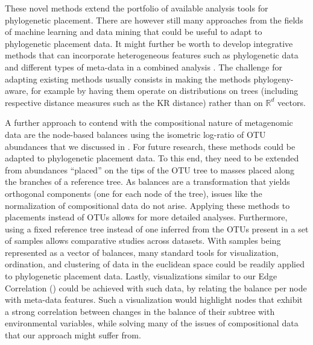 These novel methods extend the portfolio of available analysis tools for phylogenetic placement.
There are however still many approaches from the fields of machine learning and data mining
that could be useful to adapt to phylogenetic placement data.
It might further be worth to develop integrative methods that can incorporate heterogeneous features
such as phylogenetic data and different types of meta-data in a combined analysis \cite{Mariette2018}.
The challenge for adapting existing methods usually consists in making the methods phylogeny-aware,
for example by having them operate on distributions on trees
(including respective distance measures such as the KR distance) rather than on $\mathbb{R}^d$ vectors.


A further approach to contend with the compositional nature of metagenomic data are
the node-based balances using the isometric log-ratio of OTU abundances \cite{Silverman2017,Washburne2017a}
that we discussed in .
For future research, these methods could be adapted to phylogenetic placement data.
To this end, they need to be extended from abundances ``placed'' on the tips of the OTU tree
to masses placed along the branches of a reference tree.
As balances are a transformation that yields orthogonal components (one for each node of the tree),
issues like the normalization of compositional data do not arise.
Applying these methods to placements instead of OTUs allows for more detailed analyses.
Furthermore, using a fixed reference tree instead of one inferred from the OTUs present in a set of samples
allows comparative studies across datasets.
With samples being represented as a vector of balances,
many standard tools for visualization, ordination, and clustering of data in the euclidean space
could be readily applied to phylogenetic placement data.
Lastly, visualizations similar to our Edge Correlation ()
could be achieved with such data, by relating the balance per node with meta-data features.
Such a visualization would highlight nodes that exhibit a strong correlation
between changes in the balance of their subtree with environmental variables,
while solving many of the issues of compositional data that our approach might suffer from.

